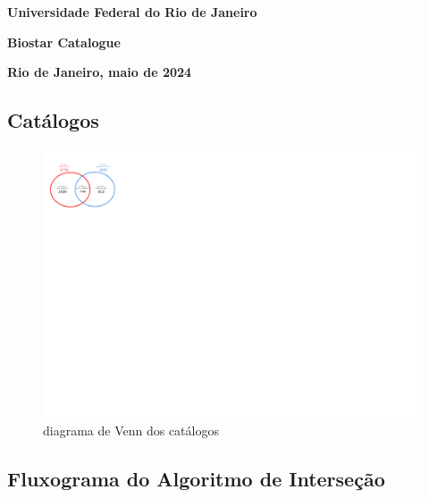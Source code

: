 \documentclass{article}
\begin{document}
		\begin{titlepage}
		\begin{center}
			{\large \textbf{Universidade Federal do Rio de Janeiro}}

			\vspace{9cm}	
			
			{\Large \textbf{Biostar Catalogue}}\\
			
			\vspace{9cm}
			
			\textbf{Rio de Janeiro, maio de 2024}
		\end{center}	
	\end{titlepage}
	
	\newpage
	\begin{center}
		\section*{\small Catálogos}
	\end{center}
	\vspace{50pt}	
	
	
	\begin{figure}[h]
		\centering
		\includegraphics[width=\textwidth, trim = 0cm 16.4cm 23cm 1.1cm, clip]{catalogues.pdf}
		\caption*{\scriptsize diagrama de Venn dos catálogos}
	\end{figure}
	
	\newpage
	\begin{center}
	\section*{\small Fluxograma do Algoritmo de Interseção}
	\end{center}
	\vspace{50pt}	
	
\end{document}

